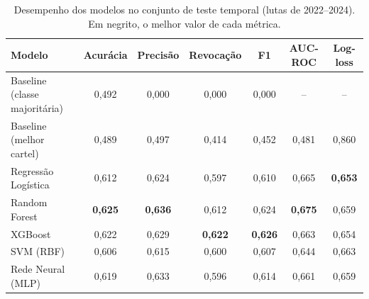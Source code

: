 \begin{table}[t]
\centering
\caption{Desempenho dos modelos no conjunto de teste temporal (lutas de 2022--2024). Em negrito, o melhor valor de cada métrica.}
\label{tab:metricas}
\begin{tabular}{lcccccc}
\toprule
Modelo & Acurácia & Precisão & Revocação & F1 & AUC-ROC & Log-loss \\
\midrule
Baseline (classe majoritária) & 0,492 & 0,000 & 0,000 & 0,000 & -- & -- \\
Baseline (melhor cartel) & 0,489 & 0,497 & 0,414 & 0,452 & 0,481 & 0,860 \\
Regressão Logística & 0,612 & 0,624 & 0,597 & 0,610 & 0,665 & \textbf{0,653} \\
Random Forest & \textbf{0,625} & \textbf{0,636} & 0,612 & 0,624 & \textbf{0,675} & 0,659 \\
XGBoost & 0,622 & 0,629 & \textbf{0,622} & \textbf{0,626} & 0,663 & 0,654 \\
SVM (RBF) & 0,606 & 0,615 & 0,600 & 0,607 & 0,644 & 0,663 \\
Rede Neural (MLP) & 0,619 & 0,633 & 0,596 & 0,614 & 0,661 & 0,659 \\
\bottomrule
\end{tabular}
\end{table}
